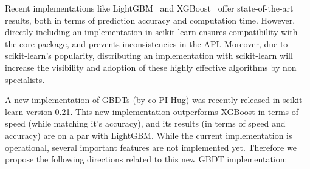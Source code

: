 \documentclass[11pt]{article}  %
\begin{document}
Recent implementations like LightGBM~\cite{LightGBM} and XGBoost~\cite{XGB}
offer state-of-the-art results, both in terms of prediction accuracy and
computation time. However, directly including an implementation in scikit-learn ensures compatibility with the core package, and prevents inconsistencies in the API. Moreover, due to scikit-learn's popularity, distributing an implementation with scikit-learn will increase the visibility and adoption of these highly effective algorithms by non specialists.

A new implementation of GBDTs (by co-PI Hug) was recently
released in scikit-learn version 0.21. This new implementation
outperforms XGBoost in terms of speed (while matching it's accuracy), and its results (in terms of speed and accuracy)
are on a par with LightGBM. While the current implementation is operational,
several important features are not implemented yet. Therefore we propose the following directions related to this new GBDT implementation:
\end{document}
